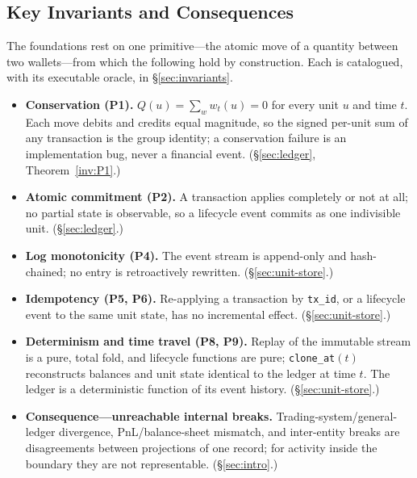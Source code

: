 \subsection*{Key Invariants and Consequences}

The foundations rest on one primitive---the atomic move of a quantity between two
wallets---from which the following hold by construction. Each is catalogued, with its
executable oracle, in \S\ref{sec:invariants}.

\begin{itemize}[nosep]
\item \textbf{Conservation (P1).} $Q(u)=\sum_w w_t(u)=0$ for every unit $u$ and time $t$.
Each move debits and credits equal magnitude, so the signed per-unit sum of any
transaction is the group identity; a conservation failure is an implementation bug, never
a financial event. (\S\ref{sec:ledger}, Theorem~\ref{inv:P1}.)
\item \textbf{Atomic commitment (P2).} A transaction applies completely or not at all; no
partial state is observable, so a lifecycle event commits as one indivisible unit.
(\S\ref{sec:ledger}.)
\item \textbf{Log monotonicity (P4).} The event stream is append-only and hash-chained; no
entry is retroactively rewritten. (\S\ref{sec:unit-store}.)
\item \textbf{Idempotency (P5, P6).} Re-applying a transaction by \texttt{tx\_id}, or a
lifecycle event to the same unit state, has no incremental effect.
(\S\ref{sec:unit-store}.)
\item \textbf{Determinism and time travel (P8, P9).} Replay of the immutable stream is a
pure, total fold, and lifecycle functions are pure; \texttt{clone\_at}$(t)$ reconstructs
balances and unit state identical to the ledger at time $t$. The ledger is a deterministic
function of its event history. (\S\ref{sec:unit-store}.)
\item \textbf{Consequence---unreachable internal breaks.} Trading-system/general-ledger
divergence, PnL/balance-sheet mismatch, and inter-entity breaks are disagreements between
projections of one record; for activity inside the boundary they are not representable.
(\S\ref{sec:intro}.)
\end{itemize}
